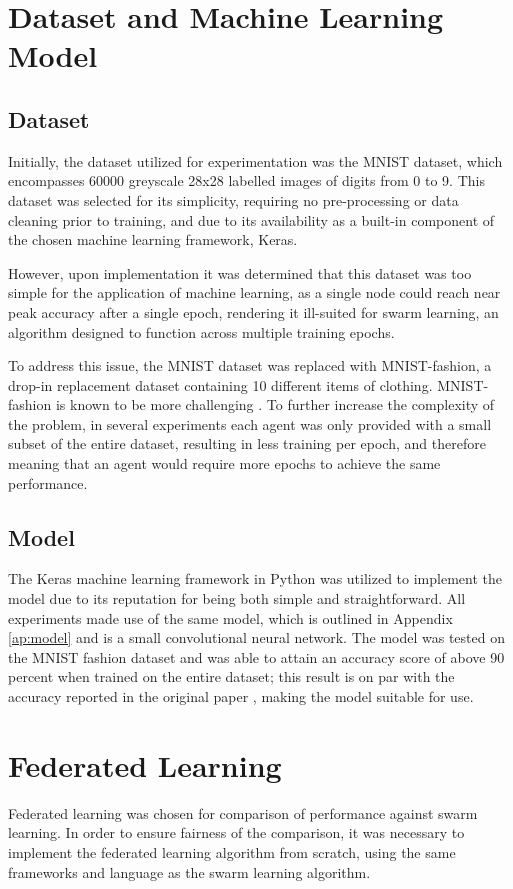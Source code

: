 \section{Dataset and Machine Learning Model}
\subsection{Dataset}
Initially, the dataset utilized for experimentation was the MNIST dataset, which encompasses 60000 greyscale 28x28 labelled images of digits from 0 to 9. This dataset was selected for its simplicity, requiring no pre-processing or data cleaning prior to training, and due to its availability as a built-in component of the chosen machine learning framework, Keras.

However, upon implementation it was determined that this dataset was too simple for the application of machine learning, as a single node could reach near peak accuracy after a single epoch, rendering it ill-suited for swarm learning, an algorithm designed to function across multiple training epochs.

To address this issue, the MNIST dataset was replaced with MNIST-fashion, a drop-in replacement dataset containing 10 different items of clothing. MNIST-fashion is known to be more challenging . To further increase the complexity of the problem, in several experiments each agent was only provided with a small subset of the entire dataset, resulting in less training per epoch, and therefore meaning that an agent would require more epochs to achieve the same performance.

\subsection{Model}
The Keras machine learning framework in Python was utilized to implement the model due to its reputation for being both simple and straightforward. All experiments made use of the same model, which is outlined in Appendix \ref{ap:model} and is a small convolutional neural network. The model was tested on the MNIST fashion dataset and was able to attain an accuracy score of above 90 percent when trained on the entire dataset; this result is on par with the accuracy reported in the original paper , making the model suitable for use.


\section{Federated Learning}
Federated learning was chosen for comparison of performance against swarm learning. In order to ensure fairness of the comparison, it was necessary to implement the federated learning algorithm from scratch, using the same frameworks and language as the swarm learning algorithm.
